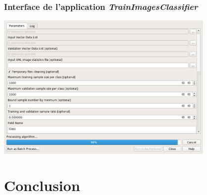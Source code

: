 \documentclass[8pt]{beamer}
\begin{document}
\begin{frame}
\frametitle{Interface de l'application \textit{TrainImagesClassifier}}
\begin{center}
\includegraphics[width=0.8\textwidth]{images/qgis_train_classif.png}
\end{center} 
\end{frame}



\section{Conclusion}
\end{document}
